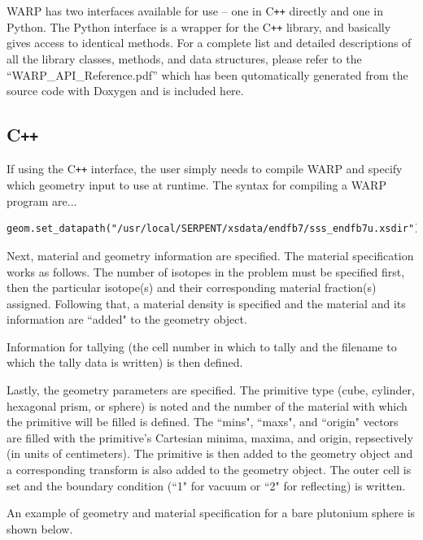 \documentclass[twoside,a4paper]{refart}
\begin{document}
WARP has two interfaces available for use -- one in C\texttt{++} directly and one in Python.  The Python interface is a wrapper for the C\texttt{++} library, and basically gives access to identical methods.  For a complete list and detailed descriptions of all the library classes, methods, and data structures, please refer to the ``WARP\_API\_Reference.pdf'' which has been qutomatically generated from the source code with Doxygen and is included here.

\subsection{C\texttt{++}}

If using the C\texttt{++} interface, the user simply needs to compile WARP and specify which geometry
input to use at runtime. The syntax for compiling a WARP program are...



\begin{verbatim}
geom.set_datapath("/usr/local/SERPENT/xsdata/endfb7/sss_endfb7u.xsdir");
\end{verbatim}

Next, material and geometry information are specified. The material specification works as follows. The 
number of isotopes in the problem must be specified first, then the particular isotope(s) and their 
corresponding material fraction(s) assigned. Following that, a material density is specified and the 
material and its information are ``added" to the geometry object.

Information for tallying (the cell number in which to tally and the filename to which the tally data is written) is then defined.

Lastly, the geometry parameters are specified. The primitive type (cube, cylinder, hexagonal prism, or sphere) is noted and the number of the material with which the primitive will be filled is defined. The 
``mins", ``maxs", and ``origin" vectors are filled with the primitive's Cartesian minima, maxima, and origin, repsectively (in units of centimeters). The primitive is then added to the geometry object and a corresponding transform is also added to the geometry object. The outer cell is set and the boundary
condition (``1" for vacuum or ``2" for reflecting) is written.

An example of geometry and material specification for a bare plutonium sphere is shown below.
\end{document}
